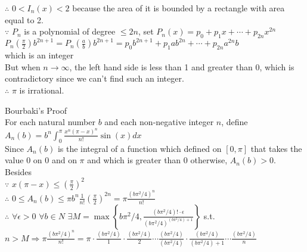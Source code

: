 \documentclass{article}
\begin{document}
$\therefore$ \qquad $0 < I_n(x) < 2$ because the area of  it is bounded by a rectangle with area equal to 2.\\

$\because$ \qquad $P_n$ is a polynomial of degree $\leq 2n$, set $P_n(x) = p_0 +p_1x + \cdots + p_{2n}x^{2n}$\\

$\displaystyle P_n \left(\frac{\pi}{2}\right)b^{2n+1} = P_n \left(\frac{a}{b}\right)b^{2n+1} = p_0 b^{2n+1} + p_1 a b^{2n} + \cdots +p_{2n}a^{2n}b$\\

which is an integer\\

But when $n \to \infty$, the left hand side is less than 1 and greater than 0, which is contradictory since we can't find such an integer.\\

$\therefore$ \qquad $\pi$ is irrational.\\

\vskip 3cm

\textcolor[rgb]{0.00,0.00,0.50}{Bourbaki's Proof}\\

For each natural number $b$ and each non-negative integer $n$, define\\

$\displaystyle A_n(b) = b^n \int_0^{\pi} \frac{x^n (\pi-x)^n}{n!} \sin{(x)} dx$\\

Since $A_n(b)$ is the integral of a function which defined on $[0,\pi]$ that takes the value 0 on 0 and on $\pi$ and which is greater than 0 otherwise, $A_n(b) > 0$.\\

Besides\\

$\because$ \qquad $\displaystyle x(\pi - x) \leq \left(\frac{\pi}{2}\right)^2$\\

$\therefore$ \qquad $\displaystyle 0 \leq A_n(b) \leq \pi b^n \frac{1}{n!} \left(\frac{\pi}{2}\right)^{2n} = \pi \frac{(b\pi^2/4)^n}{n!}$\\

$\therefore$ \qquad $\forall \epsilon > 0$ \quad $\forall b \in N$ \quad $\displaystyle \exists M = \max \left\{b\pi^2/4,\frac{(b\pi^2/4)! \cdot \epsilon}{(b\pi^2/4)^{(b\pi^2/4)+1}}\right\}$ s.t.\\

$\displaystyle n > M \Rightarrow \pi \frac{(b\pi^2/4)^n}{n!} = \pi \cdot \frac{(b\pi^2/4)}{1} \cdot \frac{(b\pi^2/4)}{2} \cdots \frac{(b\pi^2/4)}{(b\pi^2/4)} \cdot \frac{(b\pi^2/4)}{(b\pi^2/4)+1} \cdots \frac{(b\pi^2/4)}{n}$\\
\end{document}
